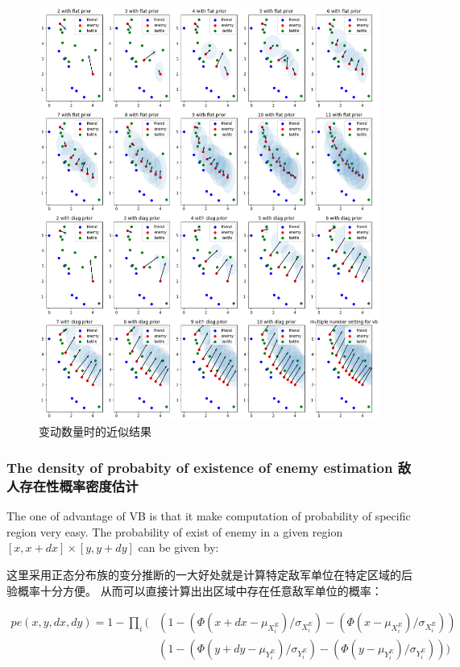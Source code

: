 \documentclass{article}
\begin{document}
\begin{figure}[ht]
\includegraphics[width=0.99\linewidth]{big_vb.png}
\caption{变动数量时的近似结果}
\label{fig:bigVb}
\end{figure}

\subsubsection{The density of probabity of existence of enemy estimation 敌人存在性概率密度估计}

The one of advantage of VB is that it make computation of probability of specific region very easy.
The probability of exist of enemy in a given region $[x,x+dx]\times[y,y+dy]$ can be given by:

这里采用正态分布族的变分推断的一大好处就是计算特定敌军单位在特定区域的后验概率十分方便。
从而可以直接计算出出区域中存在任意敌军单位的概率：

\begin{align*}
pe(x,y,dx,dy) = 1 - \prod_i (
& (1-(\Phi(x+dx - \mu_{X^E_i})/\sigma_{X^E_i}) -  (\Phi(x - \mu_{X^E_i})/\sigma_{X^E_i})) \\
& (1-(\Phi(y+dy - \mu_{Y^E_i})/\sigma_{Y^E_i}) -  (\Phi(y - \mu_{Y^E_i})/\sigma_{Y^E_i}))
)
\end{align*}
\end{document}

